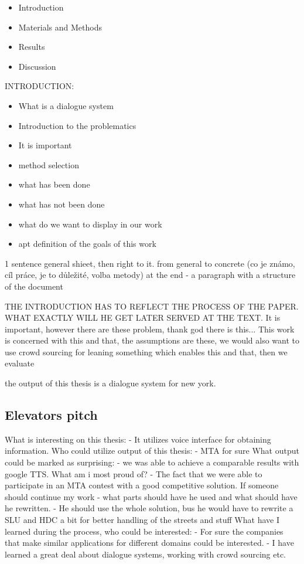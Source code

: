\begin{itemize}
	\item Introduction
	\item Materials and Methods
	\item Results
	\item Discussion
\end{itemize}

INTRODUCTION:

\begin{itemize}
	\item What is a dialogue system
	\item Introduction to the problematics
	\item It is important
	\item method selection
	\item what has been done
	\item what has not been done
	\item what do we want to display in our work
	\item apt definition of the goals of this work
\end{itemize}


1 sentence general shieet, then right to it.
from general to concrete
(co je známo, cíl práce, je to důležité, volba metody)
at the end - a paragraph with a structure of the document


THE INTRODUCTION HAS TO REFLECT THE PROCESS OF THE PAPER. WHAT EXACTLY WILL HE GET LATER SERVED AT THE TEXT.
It is important, however there are these problem, thank god there is this...
This work is concerned with this and that, the assumptions are these, we would also want to use crowd sourcing for leaning something which enables this and that, then we evaluate

the output of this thesis is a dialogue system for new york.

\subsection{Elevators pitch} %
\label{sub:elevators_pitch}

What is interesting on this thesis: 
 - It utilizes voice interface for obtaining information.
Who could utilize output of this thesis:
 - MTA for sure
What output could be marked as surprising:
 - we was able to achieve a comparable results with google TTS.
What am i most proud of?
 - The fact that we were able to participate in an MTA contest with a good competitive solution.
If someone should continue my work - what parts should have he used and what should have he rewritten.
 - He should use the whole solution, bus he would have to rewrite a SLU and HDC a bit for better handling of the streets and stuff
What have I learned during the process, who could be interested:
 - For sure the companies that make similar applications for different domains could be interested.
 - I have learned a great deal about dialogue systems, working with crowd sourcing etc.


